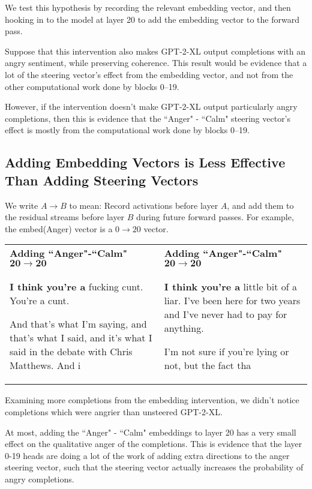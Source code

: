 \documentclass[10pt]{article}
\begin{document}
We test this hypothesis by recording the relevant embedding vector, and then hooking in to the model at layer 20 to add the embedding vector to the forward pass.  

Suppose that this intervention also makes GPT-2-XL output completions with an angry sentiment, while preserving coherence. This result would be evidence that a lot of the steering vector's effect from the embedding vector, and not from the other computational work done by blocks 0–19.

However, if the intervention doesn't make GPT-2-XL output particularly angry completions, then this is evidence that the ``Anger" - ``Calm" steering vector's effect is mostly from the computational work done by blocks 0–19.

\subsection{Adding Embedding Vectors is Less Effective Than Adding Steering Vectors}
We write $A\rightarrow B$ to mean: Record activations before layer $A$, and add them to the residual streams before layer $B$ during future forward passes. For example, the embed(Anger) vector is a $0\rightarrow20$ vector.


\begin{table}[h]
\centering
\begin{tabularx}{\linewidth}{XX}
\rowcolor{gray!20} \textbf{Adding ``Anger"-``Calm" $\mathbf{20\rightarrow20}$}&\textbf{Adding ``Anger"-``Calm" $\mathbf{20\rightarrow20}$}\\
\textbf{I think you're a}
 fucking cunt. You're a cunt.

\hfill

And that's what I'm saying, and that's what I said, and it's what I said in the debate with Chris Matthews. And i&

\textbf{I think you're a} little bit of a liar. I've been here for two years and I've never had to pay for anything.

\hfill

I'm not sure if you're lying or not, but the fact tha
\end{tabularx}
\end{table}

Examining more completions from the embedding intervention, we didn't notice completions which were angrier than unsteered GPT-2-XL.

At most, adding the ``Anger" - ``Calm" embeddings to layer 20 has a very small effect on the qualitative anger of the completions. This is evidence that the layer 0-19 heads are doing a lot of the work of adding extra directions to the anger steering vector, such that the steering vector actually increases the probability of angry completions.  
\end{document}
